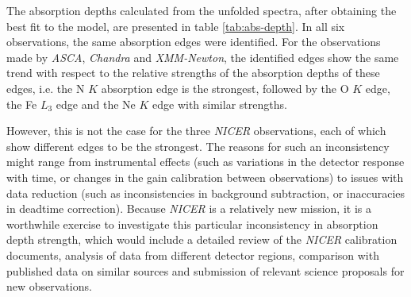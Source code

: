     The absorption depths calculated from the unfolded spectra, after obtaining the best fit to the model, are presented in table \ref{tab:abs-depth}. In all six observations, the same absorption edges were identified. For the observations made by \textit{ASCA}, \textit{Chandra} and \textit{XMM-Newton}, the identified edges show the same trend with respect to the relative strengths of the absorption depths of these edges, i.e. the N $K$ absorption edge is the strongest, followed by the O $K$ edge, the Fe $L_3$ edge and the Ne $K$ edge with similar strengths.
    
    However, this is not the case for the three \textit{NICER} observations, each of which show different edges to be the strongest. The reasons for such an inconsistency might range from instrumental effects (such as variations in the detector response with time, or changes in the gain calibration between observations) to issues with data reduction (such as inconsistencies in background subtraction, or inaccuracies in deadtime correction). Because \textit{NICER} is a relatively new mission, it is a worthwhile exercise to investigate this particular inconsistency in absorption depth strength, which would include a detailed review of the \textit{NICER} calibration documents, analysis of data from different detector regions, comparison with published data on similar sources and submission of relevant science proposals for new observations.